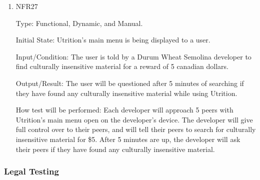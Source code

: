 \documentclass[12pt, titlepage]{article}
\begin{document}
	
	\begin{enumerate}
		\item{NFR27\\} 
		
		Type: Functional, Dynamic, and Manual.
		
		Initial State: Utrition’s main menu is being displayed to a user.
		
		Input/Condition: The user is told by a Durum Wheat Semolina developer to find culturally insensitive material for a reward of 5 canadian dollars.
		
		Output/Result: The user will be questioned after 5 minutes of searching if they have found any culturally insensitive material while using Utrition.
		
		How test will be performed: Each developer will approach 5 peers with Utrition’s main menu open on the developer’s device. The developer will give full control over to their peers, and will tell their peers to search for culturally insensitive material for \$5. After 5 minutes are up, the developer will ask their peers if they have found any culturally insensitive material.
		
	\end{enumerate}
	
	\subsubsection{Legal Testing}
	
	
\end{document}
